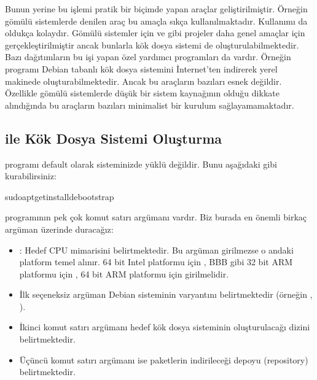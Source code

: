 \documentclass[a4paper,10pt,turkish]{sphinxmanual}
\begin{document}
\sphinxAtStartPar
Bunun yerine bu işlemi pratik bir biçimde yapan araçlar geliştirilmiştir. Örneğin gömülü sistemlerde
 denilen araç bu amaçla sıkça kullanılmaktadır. Kullanımı da oldukça kolaydır. Gömülü sistemler
için  ve  gibi projeler daha genel amaçlar için gerçekleştirilmiştir ancak bunlarla kök
dosya sistemi de oluşturulabilmektedir. Bazı dağıtımların bu işi yapan özel yardımcı programları da vardır.
Örneğin  programı Debian tabanlı kök dosya sistemini İnternet’ten indirerek yerel makinede
oluşturabilmektedir. Ancak bu araçların bazıları esnek değildir. Özellikle gömülü sistemlerde düşük bir
sistem kaynağının olduğu dikkate alındığında bu araçların bazıları minimalist bir kurulum
sağlayamamaktadır.


\subsection{ ile Kök Dosya Sistemi Oluşturma}
\label{\detokenize{kernelcompilation:debootstrap-ile-kok-dosya-sistemi-olusturma}}
\sphinxAtStartPar
{} programı default olarak sisteminizde yüklü değildir. Bunu aşağıdaki gibi kurabilirsiniz:

\begin{sphinxVerbatim}[commandchars=\\\{\}]
\PYGZdl{}sudoapt\PYGZhy{}getinstalldebootstrap
\end{sphinxVerbatim}

\sphinxAtStartPar
{} programının pek çok komut satırı argümanı vardır. Biz burada en önemli birkaç argüman
üzerinde duracağız:
\begin{itemize}
\item {} 
\sphinxAtStartPar
{}: Hedef CPU mimarisini belirtmektedir. Bu argüman girilmezse o andaki platform temel alınır.
64 bit Intel platformu için , BBB gibi 32 bit ARM platformu için , 64 bit ARM platformu
için  girilmelidir.

\item {} 
\sphinxAtStartPar
İlk seçeneksiz argüman Debian sisteminin varyantını belirtmektedir (örneğin , ).

\item {} 
\sphinxAtStartPar
İkinci komut satırı argümanı hedef kök dosya sisteminin oluşturulacağı dizini belirtmektedir.

\item {} 
\sphinxAtStartPar
Üçüncü komut satırı argümanı ise paketlerin indirileceği depoyu (repository) belirtmektedir.

\end{itemize}
\end{document}
